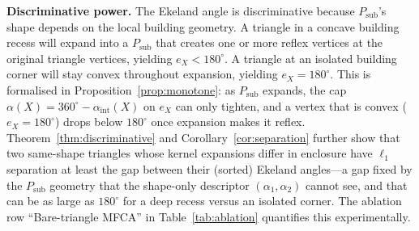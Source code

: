 \documentclass[10pt]{article}
\theoremstyle{plain}
\theoremstyle{definition}
\begin{document}
\noindent\textbf{Discriminative power.}
The Ekeland angle is discriminative because $P_{\mathrm{sub}}$'s shape
depends on the local building geometry.
A triangle in a concave building recess will expand into a $P_{\mathrm{sub}}$
that creates one or more reflex vertices at the original triangle vertices,
yielding $e_X < 180^\circ$.
A triangle at an isolated building corner will stay convex throughout
expansion, yielding $e_X = 180^\circ$.
This is formalised in Proposition~\ref{prop:monotone}: as $P_{\mathrm{sub}}$
expands, the cap $\alpha(X)=360^\circ-\alpha_{\mathrm{int}}(X)$ on $e_X$ can only
tighten, and a vertex that is convex ($e_X=180^\circ$) drops below $180^\circ$
once expansion makes it reflex.
Theorem~\ref{thm:discriminative} and Corollary~\ref{cor:separation} further
show that two same-shape triangles whose kernel expansions differ in enclosure
have $\ell_1$ separation at least the gap between their (sorted) Ekeland
angles---a gap fixed by the $P_{\mathrm{sub}}$ geometry that the shape-only
descriptor $(\alpha_1,\alpha_2)$ cannot see, and that can be as large as
$180^\circ$ for a deep recess versus an isolated corner.
The ablation row ``Bare-triangle MFCA'' in Table~\ref{tab:ablation}
quantifies this experimentally.
\end{document}
